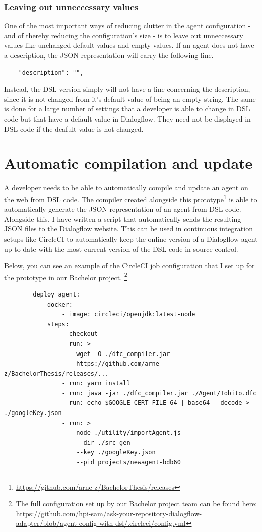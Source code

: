 \subsubsection{Leaving out unneccessary values}

One of the most important ways of reducing clutter in the agent configuration - and of thereby reducing the configuration's size - is to leave out unneccessary values like unchanged default values and empty values.
If an agent does not have a description, the JSON representation will carry the following line.
\begin{verbatim}
    "description": "",
\end{verbatim}
Instead, the DSL version simply will not have a line concerning the description, since it is not changed from it's default value of being an empty string.
The same is done for a large number of settings that a developer is able to change in DSL code but that have a default value in Dialogflow. They need not be displayed in DSL code if the deafult value is not changed.


\section{Automatic compilation and update}
A developer needs to be able to automatically compile and update an agent on the web from DSL code.
The compiler created alongside this prototype\footnote{\url{https://github.com/arne-z/BachelorThesis/releases}} is able to automatically generate the JSON representation of an agent from DSL code.
Alongside this, I have written a script that automatically sends the resulting JSON files to the Dialogflow website.
This can be used in continuous integration setups like CircleCI \cite{CircleCI} to automatically keep the online version of a Dialogflow agent up to date with the most current version of the DSL code in source control.

Below, you can see an example of the CircleCI job configuration that I set up for the prototype in our Bachelor project.
\footnote{The full configuration set up by our Bachelor project team can be found here:\\
\url{https://github.com/hpi-sam/ask-your-repository-dialogflow-adapter/blob/agent-config-with-dsl/.circleci/config.yml}}
\begin{samepage}    
    \begin{verbatim}
        deploy_agent:
            docker:
                - image: circleci/openjdk:latest-node
            steps:
                - checkout
                - run: > 
                    wget -O ./dfc_compiler.jar
                    https://github.com/arne-z/BachelorThesis/releases/...
                - run: yarn install
                - run: java -jar ./dfc_compiler.jar ./Agent/Tobito.dfc
                - run: echo $GOOGLE_CERT_FILE_64 | base64 --decode > ./googleKey.json
                - run: >
                    node ./utility/importAgent.js 
                    --dir ./src-gen 
                    --key ./googleKey.json 
                    --pid projects/newagent-bdb60
    \end{verbatim}
\end{samepage}

